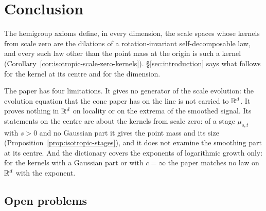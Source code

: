 \section{Conclusion}\label{sec:conclusion}

The hemigroup axioms define, in every dimension, the scale spaces whose kernels from scale zero
are the dilations of a rotation-invariant self-decomposable law, and every such law other than
the point mass at the origin is such a kernel
(Corollary~\ref{cor:isotropic-scale-zero-kernels}). \S\ref{sec:introduction} says what follows for
the kernel at its centre and for the dimension.

The paper has four limitations. It gives no generator of
the scale evolution: the evolution equation that the cone paper has on the line
 is not carried to $\mathbb{R}^d$. It proves nothing in $\mathbb{R}^d$ on locality or on
the extrema of the smoothed signal. Its statements on the centre are about the kernels from
scale zero: of a stage $\mu_{s,t}$ with $s > 0$ and no Gaussian part it gives the point mass
and its size
(Proposition~\ref{prop:isotropic-stages}), and it does not examine the smoothing part at its
centre. And the dictionary covers the
exponents of logarithmic growth only: for the kernels
with a Gaussian part or with $c = \infty$ the paper matches no law on $\mathbb{R}^d$ with the exponent.

\subsection{Open problems}\label{sec:open-problems}


